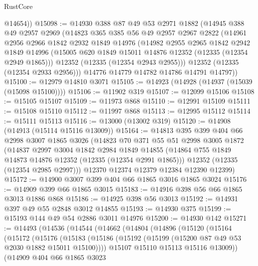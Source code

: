 \begin{lexlean}{RustCore}
\begin{coremodule}
        @14654))
@15098 := @14930
    @388
    @87
    @49
    @53
    @2971
    @1882
    (@14945
      @388
      @49
      @2957
      @2969
      (@14823
        @365
        @385
        @56
        @49
        @2957
        @2967
        @2822
        (@14961
          @2956
          @2966
          @1842
          @2932
          @1849
          @14976
          (@14982
            @2955
            @2965
            @1842
            @2942
            @1849
            @14996
            (@15005 @620 @1849 @15011 @14876 @12352 (@12335 (@12354 @2949 @1865)))
            @12352
            (@12335 (@12354 @2943 @2955)))
          @12352
          (@12335 (@12354 @2933 @2956)))
        @14776
        @14779
        @14782
        @14786
        @14791
        @14797))
@15100 := @12979 @14810 @3071
@15105 := @14923 (@14928 (@14937 (@15039 (@15098 @15100))))
@15106 := @11902 @319
@15107 := @12099 @15106
@15108 := @15105 @15107
@15109 := @11973 @868
@15110 := @12991 @15109
@15111 := @15108 @15110
@15112 := @11997 @868
@15113 := @12995 @15112
@15114 := @15111 @15113
@15116 := @13000 (@13002 @319)
@15120 := @14908 (@14913 (@15114 @15116 @13009))
@15164 := @14813
    @395
    @399
    @404
    @66
    @2998
    @3007
    @1865
    @3026
    (@14823
      @70
      @371
      @55
      @51
      @2998
      @3005
      @1872
      (@14837
        @2997
        @3004
        @1842
        @2984
        @1849
        @14855
        (@14864 @755 @1849 @14873 @14876 @12352 (@12335 (@12354 @2991 @1865)))
        @12352
        (@12335 (@12354 @2985 @2997)))
      @12370
      @12374
      @12379
      @12384
      @12390
      @12399)
@15172 := @14900 @3007 @399 @404 @66 @1865 @3016 @1865 @3024
@15176 := @14909 @399 @66 @1865 @3015
@15183 := @14916 @398 @56 @66 @1865 @3013 @1886 @868
@15186 := @14925 @398 @56 @3013
@15192 := @14931 @397 @49 @55 @2848 @3012 @14855
@15193 := @14930 @375
@15199 := @15193 @144 @49 @54 @2886 @3011 @14976
@15200 := @14930 @142
@15271 := @14493
    (@14536
      (@14544
        (@14662
          (@14804
            (@14896
              (@15120
                (@15164
                  (@15172
                    (@15176
                      (@15183
                        (@15186 (@15192 (@15199 (@15200 @87 @49 @53 @2030 @1882 @15011 @15100))))
                        @15107
                        @15110
                        @15113
                        @15116
                        @13009))
                    (@14909
                      @404
                      @66
                      @1865
                      @3023

\end{coremodule}
\end{lexlean}
